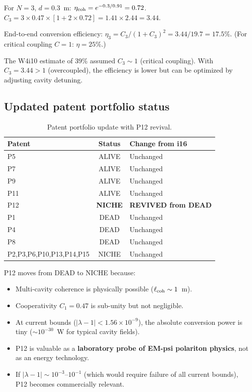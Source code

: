 \documentclass[11pt]{article}
\newcommand{\ee}[1]{\times 10^{#1}}
\begin{document}
For $N = 3$, $d = 0.3$~m: $\eta_{\rm coh} = e^{-0.3/0.91} = 0.72$.
$C_3 = 3 \times 0.47 \times [1 + 2\times 0.72] = 1.41 \times 2.44 = 3.44$.

End-to-end conversion efficiency: $\eta_3 = C_3/(1+C_3)^2 = 3.44/19.7
= 17.5\%$. (For critical coupling $C = 1$: $\eta = 25\%$.)

The W4i10 estimate of 39\% assumed $C_3 \sim 1$ (critical coupling).
With $C_3 = 3.44 > 1$ (overcoupled), the efficiency is lower but
can be optimized by adjusting cavity detuning.

\subsection{Updated patent portfolio status}

\begin{table}[H]
\centering
\caption{Patent portfolio update with P12 revival.}
\begin{tabular}{@{}lcl@{}}
\toprule
Patent & Status & Change from i16 \\
\midrule
P5 & ALIVE & Unchanged \\
P7 & ALIVE & Unchanged \\
P9 & ALIVE & Unchanged \\
P11 & ALIVE & Unchanged \\
P12 & \textbf{NICHE} & \textbf{REVIVED from DEAD} \\
P1 & DEAD & Unchanged \\
P4 & DEAD & Unchanged \\
P8 & DEAD & Unchanged \\
P2,P3,P6,P10,P13,P14,P15 & NICHE & Unchanged \\
\bottomrule
\end{tabular}
\end{table}

P12 moves from DEAD to NICHE because:
\begin{itemize}[nosep]
\item Multi-cavity coherence is physically possible ($\ell_{\rm coh} \sim 1$~m).
\item Cooperativity $C_1 = 0.47$ is sub-unity but not negligible.
\item At current bounds ($|\lambda - 1| < 1.56\ee{-9}$), the absolute
  conversion power is tiny ($\sim 10^{-30}$~W for typical cavity fields).
\item P12 is valuable as a \textbf{laboratory probe of EM-psi polariton
  physics}, not as an energy technology.
\item If $|\lambda - 1| \sim 10^{-3}$--$10^{-1}$ (which would require
  failure of all current bounds), P12 becomes commercially relevant.
\end{itemize}
\end{document}
